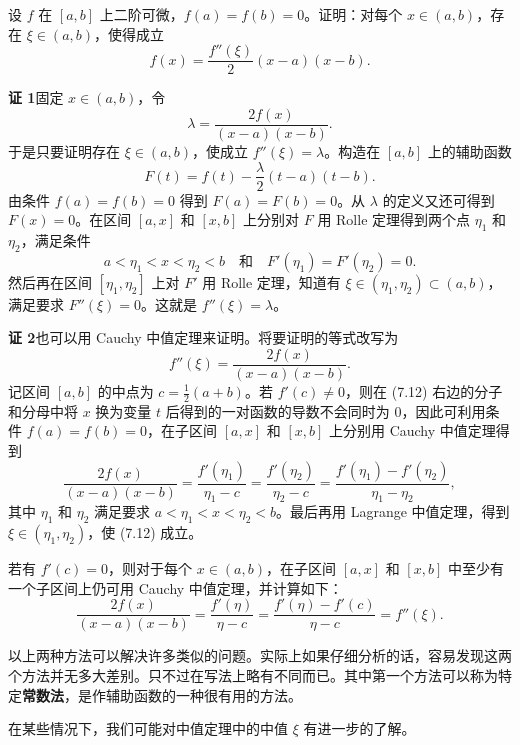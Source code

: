 \begin{xexample}[7.1.3]
设 $f$ 在 $[a,b]$ 上二阶可微，$f(a)=f(b)=0$。证明：对每个 $x\in(a,b)$，存在 $\xi\in(a,b)$，使得成立
\[
  f(x)=\frac{f''(\xi)}{2}(x-a)(x-b).
\]
\end{xexample}
\begin{xproof}
\textbf{证 1}\quad 固定 $x\in(a,b)$，令
\[
  \lambda=\frac{2f(x)}{(x-a)(x-b)}.
\]
于是只要证明存在 $\xi\in(a,b)$，使成立 $f''(\xi)=\lambda$。构造在 $[a,b]$ 上的辅助函数
\[
  F(t)=f(t)-\frac{\lambda}{2}(t-a)(t-b).
\]
由条件 $f(a)=f(b)=0$ 得到 $F(a)=F(b)=0$。从 $\lambda$ 的定义又还可得到 $F(x)=0$。在区间 $[a,x]$ 和 $[x,b]$ 上分别对 $F$ 用 Rolle 定理得到两个点 $\eta_1$ 和 $\eta_2$，满足条件
\[
  a<\eta_1<x<\eta_2<b\quad\text{和}\quad F'(\eta_1)=F'(\eta_2)=0.
\]
然后再在区间 $[\eta_1,\eta_2]$ 上对 $F'$ 用 Rolle 定理，知道有 $\xi\in(\eta_1,\eta_2)\subset(a,b)$，满足要求 $F''(\xi)=0$。这就是 $f''(\xi)=\lambda$。

\textbf{证 2}\quad 也可以用 Cauchy 中值定理来证明。将要证明的等式改写为
\begin{equation}
  f''(\xi)=\frac{2f(x)}{(x-a)(x-b)}.
  \tag{7.12}
\end{equation}
记区间 $[a,b]$ 的中点为 $c=\frac12(a+b)$。若 $f'(c)\neq0$，则在 (7.12) 右边的分子和分母中将 $x$ 换为变量 $t$ 后得到的一对函数的导数不会同时为 0，因此可利用条件 $f(a)=f(b)=0$，在子区间 $[a,x]$ 和 $[x,b]$ 上分别用 Cauchy 中值定理得到
\[
  \frac{2f(x)}{(x-a)(x-b)}
  =\frac{f'(\eta_1)}{\eta_1-c}
  =\frac{f'(\eta_2)}{\eta_2-c}
  =\frac{f'(\eta_1)-f'(\eta_2)}{\eta_1-\eta_2},
\]
其中 $\eta_1$ 和 $\eta_2$ 满足要求 $a<\eta_1<x<\eta_2<b$。最后再用 Lagrange 中值定理，得到 $\xi\in(\eta_1,\eta_2)$，使 (7.12) 成立。

若有 $f'(c)=0$，则对于每个 $x\in(a,b)$，在子区间 $[a,x]$ 和 $[x,b]$ 中至少有一个子区间上仍可用 Cauchy 中值定理，并计算如下：
\[
  \frac{2f(x)}{(x-a)(x-b)}
  =\frac{f'(\eta)}{\eta-c}
  =\frac{f'(\eta)-f'(c)}{\eta-c}
  =f''(\xi).
\]
\end{xproof}

\begin{xremark}
以上两种方法可以解决许多类似的问题。实际上如果仔细分析的话，容易发现这两个方法并无多大差别。只不过在写法上略有不同而已。其中第一个方法可以称为特定\textbf{常数法}，是作辅助函数的一种很有用的方法。
\end{xremark}

在某些情况下，我们可能对中值定理中的中值 $\xi$ 有进一步的了解。

